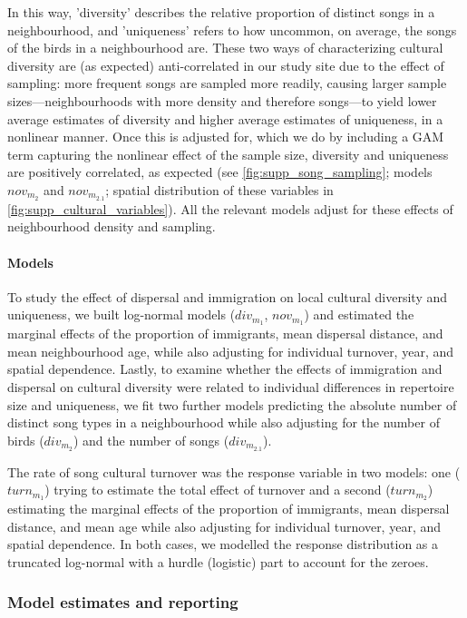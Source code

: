 \documentclass[9pt, onecolumn, twoside, lineno]{gsajnl}
\begin{document}
In this way, 'diversity' describes the relative proportion of distinct songs in a neighbourhood, and 'uniqueness' refers to how uncommon, on average, the songs of the birds in a neighbourhood are. These two ways of characterizing cultural diversity are (as expected) anti-correlated in our study site due to the effect of sampling: more frequent songs are sampled more readily, causing larger sample sizes---neighbourhoods with more density and therefore songs---to yield lower average estimates of diversity and higher average estimates of uniqueness, in a nonlinear manner. Once this is adjusted for, which we do by including  a GAM term capturing the nonlinear effect of the sample size, diversity and uniqueness are positively correlated, as expected (see \autoref{fig:supp_song_sampling}; models $nov_{m_2}$ and $nov_{m_{2.1}}$; spatial distribution of these variables in \autoref{fig:supp_cultural_variables}). All the relevant models adjust for these effects of neighbourhood density and sampling.

\paragraph{Models}

To study the effect of dispersal and immigration on local cultural diversity and uniqueness, we built log-normal models ($div_{m_1}$, $nov_{m_1}$) and estimated the marginal effects of the proportion of immigrants, mean dispersal distance, and mean neighbourhood age, while also adjusting for individual turnover, year, and spatial dependence. Lastly, to examine whether the effects of immigration and dispersal on cultural diversity were related to individual differences in repertoire size and uniqueness, we fit two further models predicting the absolute number of distinct song types in a neighbourhood while also adjusting for the number of birds ($div_{m_2}$) and the number of songs ($div_{m_{2.1}}$).

The rate of song cultural turnover was the response variable in two models: one ($turn_{m_1}$) trying to estimate the total effect of turnover and a second ($turn_{m_2}$) estimating the marginal effects of the proportion of immigrants, mean dispersal distance, and mean age while also adjusting for individual turnover, year, and spatial dependence. In both cases, we modelled the response distribution as a truncated log-normal with a hurdle (logistic) part to account for the zeroes. 

\subsubsection{Model estimates and reporting}
\end{document}
